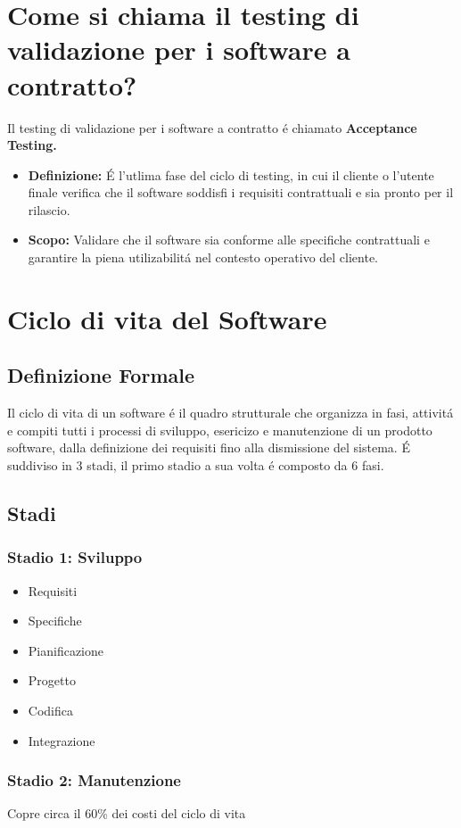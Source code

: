 \documentclass[11pt]{article}
\begin{document}
\section{Come si chiama il testing di validazione per i software a contratto?}
\label{sec:org5898aa2}
Il testing di validazione per i software a contratto é chiamato \textbf{\textbf{Acceptance Testing.}}
\begin{itemize}
\item \textbf{\textbf{Definizione:}} É l'utlima fase del ciclo di testing, in cui il cliente o l'utente finale verifica che il software soddisfi i requisiti contrattuali e sia pronto per il rilascio.
\item \textbf{\textbf{Scopo:}} Validare che il software sia conforme alle specifiche contrattuali e garantire la piena utilizabilitá nel contesto operativo del cliente.
\end{itemize}
\section{Ciclo di vita del Software}
\label{sec:orgfb5735f}
\subsection{Definizione Formale}
\label{sec:org8d4a6fd}
Il ciclo di vita di un software é il quadro strutturale che organizza in fasi, attivitá e compiti tutti i processi di sviluppo, esericizo e manutenzione di un prodotto software, dalla definizione dei requisiti fino alla dismissione del sistema.
É suddiviso in 3 stadi, il primo stadio a sua volta é composto da 6 fasi.
\subsection{Stadi}
\label{sec:org50f90c8}
\subsubsection{Stadio 1: Sviluppo}
\label{sec:orga2d1af5}
\begin{itemize}
\item Requisiti
\item Specifiche
\item Pianificazione
\item Progetto
\item Codifica
\item Integrazione
\end{itemize}
\subsubsection{Stadio 2: Manutenzione}
\label{sec:org01304bf}
Copre circa il 60\% dei costi del ciclo di vita
\end{document}
